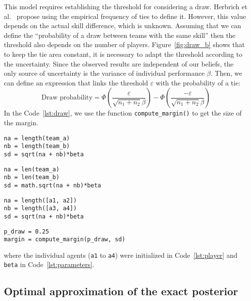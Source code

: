\documentclass[article]{jss}
\begin{document}
%
%

This model requires establishing the threshold for considering a draw. 
Herbrich et al.~\citep{Herbrich2007} propose using the empirical frequency of ties to define it. 
However, this value depends on the actual skill difference, which is unknown. 
Assuming that we can define the ``probability of a draw between teams with the same skill'' then the threshold also depends on the number of players. 
Figure~\ref{fig:draw_b} shows that to keep the tie area constant, it is necessary to adapt the threshold according to the uncertainty. 
Since the observed results are independent of our beliefs, the only source of uncertainty is the variance of individual performance $\beta$. 
Then, we can define an expression that links the threshold $\varepsilon$ with the probability of a tie: 
%
\begin{equation}
 \text{Draw probability} = \Phi(\frac{\varepsilon}{\sqrt{n_1+n_2}\beta}) - \Phi(\frac{-\varepsilon}{\sqrt{n_1+n_2}\beta})
\end{equation}
%
In the Code~\ref{lst:draw}, we use the function \texttt{compute\_margin()} to get the size of the margin. 

\begin{paracol}{3}
\begin{lstlisting}[backgroundcolor=\color{julia!60},belowskip=0cm]
na = length(team_a)
nb = length(team_b)
sd = sqrt(na + nb)*beta
\end{lstlisting}
\switchcolumn
\begin{lstlisting}[backgroundcolor=\color{python!60},belowskip=0cm]
na = len(team_a)
nb = len(team_b)
sd = math.sqrt(na + nb)*beta
\end{lstlisting}
\switchcolumn
\begin{lstlisting}[backgroundcolor=\color{r!50},belowskip=0cm]
na = length([a1, a2])
nb = length([a3, a4])
sd = sqrt(na + nb)*beta
\end{lstlisting}
\end{paracol}
\begin{lstlisting}[captionpos=b,backgroundcolor=\color{all},label=lst:draw, caption={Computing the draw margin.}, aboveskip=0cm, belowskip=0cm]
p_draw = 0.25
margin = compute_margin(p_draw, sd)
\end{lstlisting}
%
where the individual agents (\texttt{a1} to \texttt{a4}) were initialized in Code~\ref{lst:player} and \texttt{beta} in Code~\ref{lst:parameters}. 


\subsection{Optimal approximation of the exact posterior} \label{sec:approximate_posterior}
\end{document}
